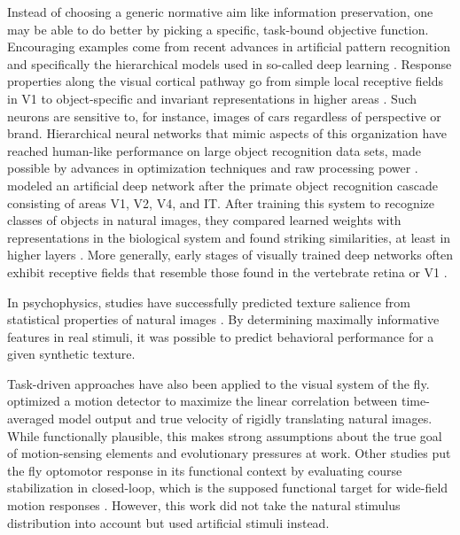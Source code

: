 Instead of choosing a generic normative aim like information preservation, one may be able to do better by picking a specific, task-bound objective function. Encouraging examples come from recent advances in artificial pattern recognition \citep{Bishop:2006aa} and specifically the hierarchical models used in so-called deep learning \citep{Goodfellow:2016aa}. Response properties along the visual cortical pathway go from simple local receptive fields in V1 to object-specific and invariant representations in higher areas \citep{Felleman:1991aa,Yamins:2016hg}. Such neurons are sensitive to, for instance, images of cars regardless of perspective or brand. Hierarchical neural networks that mimic aspects of this organization \citep{Fukushima:1980ve} have reached human-like performance on large object recognition data sets, made possible by advances in optimization techniques \citep{LeCun:1989aa} and raw processing power \citep{LeCun:2015dt}. \citet{Yamins:2014gi} modeled an artificial deep network after the primate object recognition cascade consisting of areas V1, V2, V4, and IT. After training this system to recognize classes of objects in natural images, they compared learned weights with representations in the biological system and found striking similarities, at least in higher layers \citep{Cadieu:2014in}. More generally, early stages of visually trained deep networks often exhibit receptive fields that resemble those found in the vertebrate retina or V1 \citep{Yamins:2016hg}.

In psychophysics, studies have successfully predicted texture salience from statistical properties of natural images \citep{Tkacik:2010aa,Hermundstad:2014aa}. By determining maximally informative features in real stimuli, it was possible to predict behavioral performance for a given synthetic texture.

Task-driven approaches have also been applied to the visual system of the fly. \citet{Clark:2014aa} optimized a motion detector to maximize the linear correlation between time-averaged model output and true velocity of rigidly translating natural images. While functionally plausible, this makes strong assumptions about the true goal of motion-sensing elements and evolutionary pressures at work. Other studies put the fly optomotor response in its functional context by evaluating course stabilization in closed-loop, which is the supposed functional target for wide-field motion responses \citep{Warzecha:1996bm,Warzecha:1998tn}. However, this work did not take the natural stimulus distribution into account but used artificial stimuli instead.

